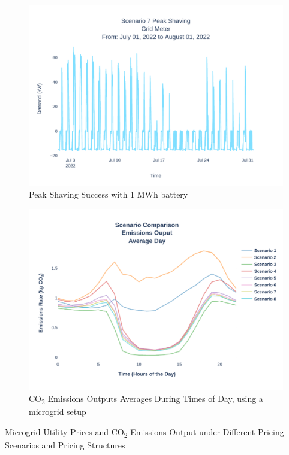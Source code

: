 \documentclass[conference]{IEEEtran}
\begin{document}
	\begin{figure}
		\centering
		\includegraphics[width=0.9\linewidth]{Fig/scenario_7_peak_shaving}
		\caption{\footnotesize Peak Shaving Success with 1 MWh battery}
		\label{fig:scenario4peakshaving}
	\end{figure}
	\begin{figure}
		\centering
		\includegraphics[width=0.9\linewidth]{Fig/emissions_scenario_comparison_run_3}
		\caption{\footnotesize  CO\textsubscript{2} Emissions Outputs Averages During Times of Day, using a microgrid setup}
		\label{fig:emissionsscenariocomparison}
	\end{figure}
	\begin{table}
		\caption{Microgrid Utility Prices and CO\textsubscript{2} Emissions Output under Different Pricing Scenarios and Pricing Structures}
		\tiny
		\centering
		
		\normalsize
		\label{tab:emissions}
	\end{table}	
\end{document}
